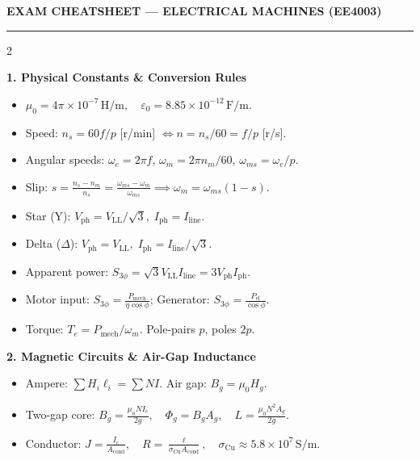 \thispagestyle{empty}
\begin{center}
{\bfseries\large EXAM CHEATSHEET --- ELECTRICAL MACHINES (EE4003)}\\[-0.5em]
\rule{\textwidth}{0.8pt}
\end{center}
\vspace{-1.2em}

\begin{multicols}{2}
\footnotesize
\setlength{\parskip}{0.18em}

\textbf{1. Physical Constants \& Conversion Rules}
\vspace{-0.3em}
\begin{itemize}\setlength{\itemsep}{0pt}\setlength{\parskip}{0pt}
  \item $\mu_0 = 4\pi\times 10^{-7}\,\mathrm{H/m},\quad \varepsilon_0 = 8.85\times 10^{-12}\,\mathrm{F/m}$.
  \item Speed: $n_s = 60f/p$ [r/min] $\Leftrightarrow n = n_s/60 = f/p$ [r/s].
  \item Angular speeds: $\omega_e = 2\pi f$, $\omega_m = 2\pi n_m/60$, $\omega_{ms} = \omega_e/p$.
  \item Slip: $s = \frac{n_s - n_m}{n_s} = \frac{\omega_{ms}-\omega_m}{\omega_{ms}} \implies \omega_m = \omega_{ms}(1-s)$.
  \item Star (Y): $V_{\mathrm{ph}} = V_{\mathrm{LL}}/\sqrt{3},\; I_{\mathrm{ph}} = I_{\mathrm{line}}$.
  \item Delta ($\Delta$): $V_{\mathrm{ph}} = V_{\mathrm{LL}},\; I_{\mathrm{ph}} = I_{\mathrm{line}}/\sqrt{3}$.
  \item Apparent power: $S_{3\phi} = \sqrt{3}V_{\mathrm{LL}}I_{\mathrm{line}} = 3V_{\mathrm{ph}}I_{\mathrm{ph}}$.
  \item Motor input: $S_{3\phi} = \frac{P_{\mathrm{mech}}}{\eta\cos\phi}$; Generator: $S_{3\phi} = \frac{P_{\mathrm{el}}}{\cos\phi}$.
  \item Torque: $T_e = P_{\mathrm{mech}}/\omega_m$. Pole-pairs $p$, poles $2p$.
\end{itemize}

\textbf{2. Magnetic Circuits \& Air-Gap Inductance}
\vspace{-0.3em}
\begin{itemize}\setlength{\itemsep}{0pt}\setlength{\parskip}{0pt}
  \item Ampere: $\sum H_i \ell_i = \sum N I$. Air gap: $B_g = \mu_0 H_g$.
  \item Two-gap core: $B_g = \frac{\mu_0 N I_c}{2g},\quad \Phi_g = B_g A_g,\quad L = \frac{\mu_0 N^2 A_g}{2g}$.
  \item Conductor: $J = \frac{I_c}{A_{\mathrm{cond}}},\quad R = \frac{\ell}{\sigma_{\mathrm{Cu}} A_{\mathrm{cond}}},\quad \sigma_{\mathrm{Cu}} \approx 5.8\times 10^7\,\mathrm{S/m}$.
\end{itemize}


\end{multicols}

